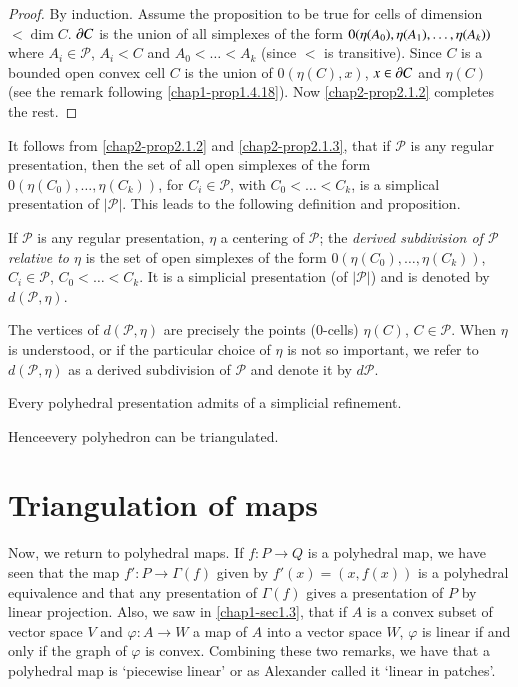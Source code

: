 \begin{proof}
By induction. Assume the proposition to be true for cells of dimension $<\dim C$. $\partial C$ is the union of all simplexes of the form $0(\eta(A_{0}),\break\eta(A_{1}),\ldots,\eta(A_{k}))$ where $A_{i}\in \mathscr{P}$, $A_{i}<C$ and $A_{0}<\ldots<A_{k}$ (since $<$ is transitive). Since $C$ is a bounded open convex cell $C$ is the union of $0(\eta(C),x)$, $x\in \partial C$ and $\eta(C)$ (see the remark following \ref{chap1-prop1.4.18}). Now \ref{chap2-prop2.1.2} completes the rest.
\end{proof}

It follows from \ref{chap2-prop2.1.2} and \ref{chap2-prop2.1.3}, that if $\mathscr{P}$ is any regular presentation, then the set of all open simplexes of the form $0(\eta(C_{0}),\ldots,\eta(C_{k}))$, for $C_{i}\in \mathscr{P}$, with $C_{0}<\ldots<C_{k}$, is a simplical presentation of $|\mathscr{P}|$. This leads to the following definition and proposition.

\begin{definition}\label{chap2-defi2.1.4}
If $\mathscr{P}$ is any regular presentation, $\eta$ a centering of $\mathscr{P}$; the {\em derived subdivision of $\mathscr{P}$ relative to $\eta$} is the set of open simplexes of the form $0(\eta(C_{0}),\ldots,\eta(C_{k}))$, $C_{i}\in \mathscr{P}$, $C_{0}<\ldots<C_{k}$. It is a simplicial presentation (of $|\mathscr{P}|$) and is denoted by $d(\mathscr{P},\eta)$.
\end{definition}

The vertices of $d(\mathscr{P},\eta)$ are precisely the points ($0$-cells) $\eta(C)$, $C\in\mathscr{P}$. When $\eta$ is understood, or if the particular choice of $\eta$ is not so important, we refer to $d(\mathscr{P},\eta)$ as a derived subdivision of $\mathscr{P}$ and denote it by $d\mathscr{P}$.

\begin{proposition}\label{chap2-prop2.1.5}
Every polyhedral presentation admits of a simplicial refinement.
\end{proposition}

Hence\pageoriginale every polyhedron can be triangulated.

\section{Triangulation of maps}\label{chap2-sec2.2}

Now, we return to polyhedral maps. If $f:P\to Q$ is a polyhedral map, we have seen that the map $f':P\to \Gamma(f)$ given by $f'(x)=(x,f(x))$ is a polyhedral equivalence and that any presentation of $\Gamma(f)$ gives a presentation of $P$ by linear projection. Also, we saw in \ref{chap1-sec1.3}, that if $A$ is a convex subset of vector space $V$ and $\varphi:A\to W$ a map of $A$ into a vector space $W$, $\varphi$ is linear if and only if the graph of $\varphi$ is convex. Combining these two remarks, we have that a polyhedral map is `piecewise linear' or as Alexander called it `linear in patches'.

